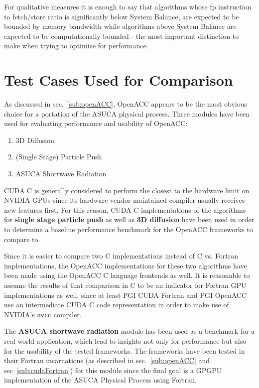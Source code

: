 For qualitative measures it is enough to say that algorithms whose fp instruction to fetch/store ratio is significantly below System Balance, are expected to be bounded by memory bandwidth while algorithms above System Balance are expected to be computationally bounded - the most important distinction to make when trying to optimize for performance. 

\section{Test Cases Used for Comparison} \label{sec:testCases}

As discussed in sec.~\ref{sub:openACC}, OpenACC appears to be the most obvious choice for a portation of the ASUCA physical process. Three modules have been used for evaluating performance and usability of OpenACC: 

\begin{enumerate}
 \item 3D Diffusion
 \item (Single Stage) Particle Push
 \item ASUCA Shortwave Radiation
\end{enumerate}

CUDA C is generally considered to perform the closest to the hardware limit on NVIDIA GPUs since its hardware vendor maintained compiler usually receives new features first. For this reason, CUDA C implementations of the algorithms for \textbf{single stage particle push} as well as \textbf{3D diffusion} have been used in order to determine a baseline performance benchmark for the OpenACC frameworks to compare to.

Since it is easier to compare two C implementations instead of C vs. Fortran implementations, the OpenACC implementations for these two algorithms have been made using the OpenACC C language frontends as well. It is reasonable to assume the results of that comparison in C to be an indicator for Fortran GPU implementations as well, since at least PGI CUDA Fortran and PGI OpenACC use an intermediate CUDA C code representation in order to make use of NVIDIA's \verb|nvcc| compiler.

The \textbf{ASUCA shortwave radiation} module has been used as a benchmark for a real world application, which lead to insights not only for performance but also for the usability of the tested frameworks. The frameworks have been tested in their Fortran incarnations (as described in sec.~\ref{sub:openACC} and sec~\ref{sub:cudaFortran}) for this module since the final goal is a GPGPU implementation of the ASUCA Physical Process using Fortran.

